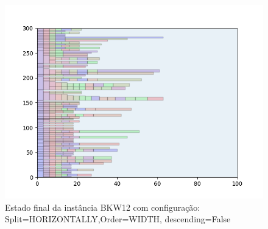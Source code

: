 \begin{figure}[H]
    \centering
    \caption[]{Estado final da instância BKW12 com configuração: Split=HORIZONTALLY,Order=WIDTH, descending=False}
    \label{fig:bkw12-horizontally-width-false}
    \includegraphics[scale=0.5]{output/figures/bkw/bkw12/horizontally/width/false/000}
\end{figure}